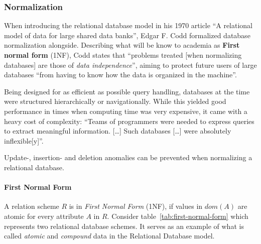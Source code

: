 \subsubsection{Normalization}
When introducing the relational database model in his 1970 article ``A relational model of data for large shared data banks'', Edgar F. Codd formalized database normalization alongside.\cite{COD70}
Describing what will be know to academia as \textbf{First normal form} (1NF), Codd states that ``problems treated [when normalizing databases] are those of \emph{data independence}'', aiming to protect future users of large databases ``from having to know how the data is organized in the machine''. \cite[p.~1]{COD70}

Being designed for as efficient as possible query handling, databases at the time were structured hierarchically or navigationally.
While this yielded good performance in times when computing time was very expensive, it came with a heavy cost of complexity:
``Teams of programmers were needed to express queries to extract meaningful information. [\dots] Such databases [\dots] were absolutely inflexible[y]''.\cite{IBM03}

Update-, insertion- and deletion anomalies can be prevented when normalizing a relational database. \cite[p.~75]{KLE11}

\paragraph{First Normal Form}
A relation scheme $R$ is in \emph{First Normal Form} (1NF), if values in \(dom(A)\) are atomic for every attribute \(A\) in \(R\). \cite[p.~96]{MAI83}
Consider table~\ref{tab:first-normal-form} which represents two relational database schemes.
It serves as an example of what is called \emph{atomic} and \emph{compound} data in the Relational Database model. \cite[p.~6]{COD90}

